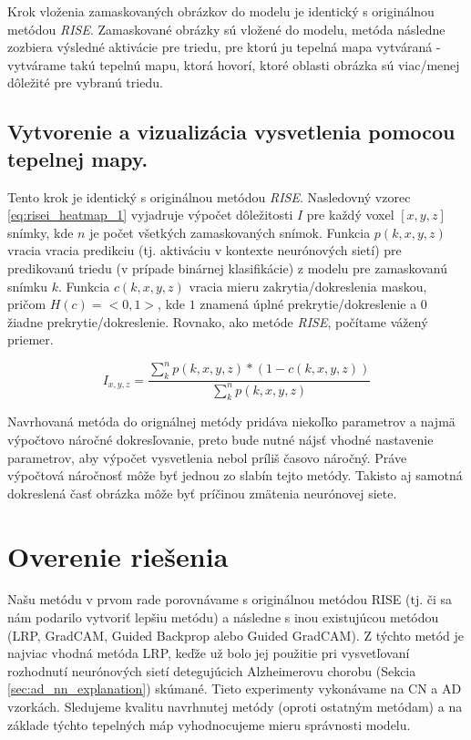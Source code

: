 Krok vloženia zamaskovaných obrázkov do modelu je identický s originálnou metódou \textit{RISE}. Zamaskované obrázky sú vložené do modelu, metóda následne zozbiera výsledné aktivácie pre triedu, pre ktorú ju tepelná mapa vytváraná - vytvárame takú tepelnú mapu, ktorá hovorí, ktoré oblasti obrázka sú viac/menej dôležité pre vybranú triedu.

\subsection{Vytvorenie a vizualizácia vysvetlenia pomocou tepelnej mapy.}

Tento krok je identický s originálnou metódou \textit{RISE}. Nasledovný vzorec \ref{eq:risei_heatmap_1} vyjadruje výpočet dôležitosti $I$ pre každý voxel $[x, y, z]$ snímky, kde $n$ je počet všetkých zamaskovaných snímok. Funkcia $p(k, x, y, z)$ vracia vracia predikciu (tj. aktiváciu v kontexte neurónových sietí) pre predikovanú triedu (v prípade binárnej klasifikácie) z modelu pre zamaskovanú snímku $k$. Funkcia $c(k, x, y, z)$ vracia mieru zakrytia/dokreslenia maskou, pričom $H(c) = <0, 1>$, kde $1$ znamená úplné prekrytie/dokreslenie a $0$ žiadne prekrytie/dokreslenie. Rovnako, ako metóde \textit{RISE}, počítame vážený priemer.

\begin{equation} 
    I_{x, y, z} = \frac{\sum_{k}^{n} p(k, x, y, z) * (1 - c(k, x, y, z))}{\sum_{k}^{n} p(k, x, y, z)}
    \label{eq:risei_heatmap_1}
\end{equation}

Navrhovaná metóda do orignálnej metódy pridáva niekoľko parametrov a najmä výpočtovo náročné dokresľovanie, preto bude nutné nájsť vhodné nastavenie parametrov, aby výpočet vysvetlenia nebol príliš časovo náročný. Práve výpočtová náročnosť môže byť jednou zo slabín tejto metódy. Takisto aj samotná dokreslená časť obrázka môže byť príčinou zmätenia neurónovej siete.

\section{Overenie riešenia \label{sec:evaluation_design}}

Našu metódu v prvom rade porovnávame s originálnou metódou RISE (tj. či sa nám podarilo vytvoriť lepšiu metódu) a následne s inou existujúcou metódou (LRP, GradCAM, Guided Backprop alebo Guided GradCAM). Z týchto metód je najviac vhodná metóda LRP, keďže už bolo jej použitie pri vysvetľovaní rozhodnutí neurónových sietí detegujúcich Alzheimerovu chorobu (Sekcia \ref{sec:ad_nn_explanation}) skúmané. Tieto experimenty vykonávame na CN a AD vzorkách. Sledujeme kvalitu navrhnutej metódy (oproti ostatným metódam) a na základe týchto tepelných máp vyhodnocujeme mieru správnosti modelu.

